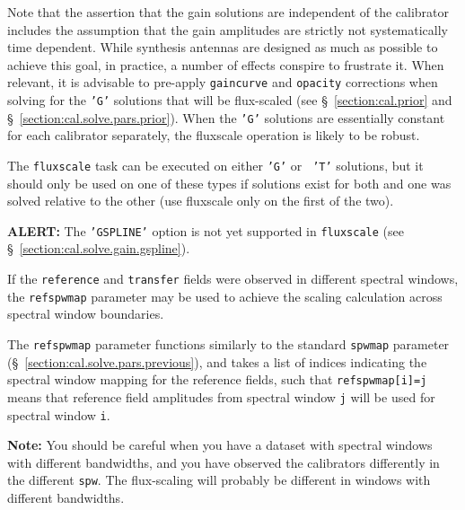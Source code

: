 Note that the assertion that the gain solutions are independent of the
calibrator includes the assumption that the gain amplitudes are
strictly not systematically time dependent.  While synthesis antennas
are designed as much as possible to achieve this goal, in practice, a
number of effects conspire to frustrate it.  When relevant, it is
advisable to pre-apply {\tt gaincurve} and {\tt opacity} 
corrections when solving
for the {\tt 'G'} solutions that will be flux-scaled (see 
\S~\ref{section:cal.prior} and \S~\ref{section:cal.solve.pars.prior}).
When the {\tt 'G'} solutions are essentially constant for each
calibrator separately, the fluxscale operation is likely to be robust.

The {\tt fluxscale} task can be executed on either {\tt 'G'} or {\tt
'T'} solutions, but it should only be used on one of these types if
solutions exist for both and one was solved relative to the other (use
fluxscale only on the first of the two).  

{\bf ALERT:} The {\tt 'GSPLINE'} option is not yet supported in
{\tt fluxscale} (see \S~\ref{section:cal.solve.gain.gspline}).

If the {\tt reference} and {\tt transfer} fields were observed in different
spectral windows, the {\tt refspwmap} parameter may be used
to achieve the scaling calculation across spectral window boundaries.

The {\tt refspwmap} parameter functions similarly to the standard
{\tt spwmap} parameter (\S~\ref{section:cal.solve.pars.previous}),
and takes a list of indices
indicating the spectral window mapping for the reference fields,
such that {\tt refspwmap[i]=j} means that reference field amplitudes
from spectral window {\tt j} will be used for spectral window {\tt i}.

{\bf Note:} You should be careful when you have a dataset with
spectral windows with different bandwidths, and you
have observed the calibrators differently in the different {\tt spw}.
The flux-scaling will probably be different in windows with different
bandwidths.

